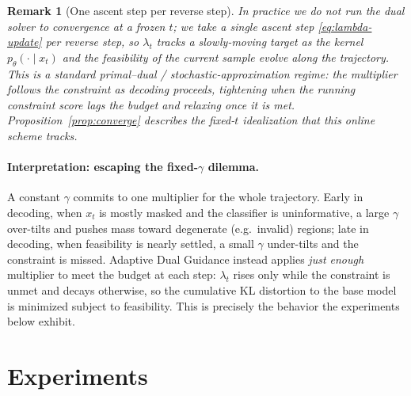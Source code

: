 \documentclass{article}
\newtheorem{remark}{Remark}
\begin{document}
\begin{remark}[One ascent step per reverse step]
In practice we do not run the dual solver to convergence at a frozen $t$; we take a \emph{single} ascent step \eqref{eq:lambda-update} per reverse step, so $\lambda_t$ tracks a slowly-moving target as the kernel $p_\theta(\cdot\mid x_t)$ and the feasibility of the current sample evolve along the trajectory. This is a standard primal--dual / stochastic-approximation regime: the multiplier follows the constraint as decoding proceeds, tightening when the running constraint score lags the budget and relaxing once it is met. Proposition~\ref{prop:converge} describes the fixed-$t$ idealization that this online scheme tracks.
\end{remark}

\paragraph{Interpretation: escaping the fixed-$\gamma$ dilemma.} A constant $\gamma$ commits to one multiplier for the whole trajectory. Early in decoding, when $x_t$ is mostly masked and the classifier is uninformative, a large $\gamma$ over-tilts and pushes mass toward degenerate (e.g.\ invalid) regions; late in decoding, when feasibility is nearly settled, a small $\gamma$ under-tilts and the constraint is missed. Adaptive Dual Guidance instead applies \emph{just enough} multiplier to meet the budget at each step: $\lambda_t$ rises only while the constraint is unmet and decays otherwise, so the cumulative KL distortion to the base model is minimized subject to feasibility. This is precisely the behavior the experiments below exhibit.

\section{Experiments}
\label{sec:experiments}
\end{document}
